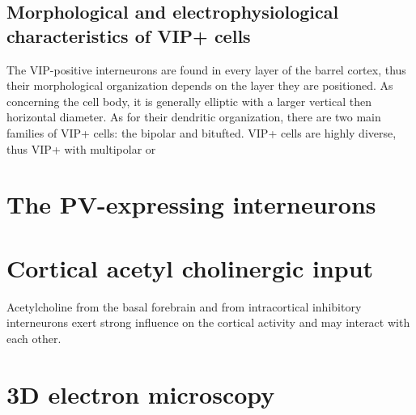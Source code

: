 \subsection{Morphological and electrophysiological characteristics of VIP+ cells }
\label{subsec:vip2}
The VIP-positive interneurons are found in every layer of the barrel cortex, thus their morphological organization depends on the layer they are positioned. As concerning the cell body, it is generally elliptic with a larger vertical then horizontal diameter. As for their dendritic organization, there are two main families of VIP+ cells: the bipolar and bitufted. VIP+ cells are highly diverse, thus VIP+ with multipolar or
\section{The PV-expressing interneurons}
\label{sec:pv}

\section{Cortical acetyl cholinergic input}
\label{sec:chat}
Acetylcholine from the basal forebrain and from intracortical inhibitory interneurons exert strong influence on the cortical activity and may interact with each other.
\section{3D electron microscopy}
\label{sec:EM microscopy}
